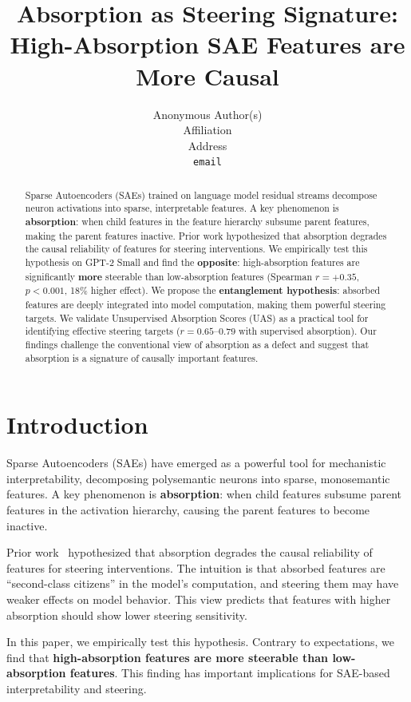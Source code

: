 \documentclass{article}
\title{Absorption as Steering Signature: High-Absorption SAE Features are More Causal}
\author{%
  Anonymous Author(s) \\
  Affiliation \\
  Address \\
  \texttt{email}
}
\begin{document}
\maketitle


\begin{abstract}
Sparse Autoencoders (SAEs) trained on language model residual streams decompose neuron activations into sparse, interpretable features. A key phenomenon is \textbf{absorption}: when child features in the feature hierarchy subsume parent features, making the parent features inactive. Prior work hypothesized that absorption degrades the causal reliability of features for steering interventions. We empirically test this hypothesis on GPT-2 Small and find the \textbf{opposite}: high-absorption features are significantly \textbf{more} steerable than low-absorption features (Spearman $r=+0.35$, $p<0.001$, 18\% higher effect). We propose the \textbf{entanglement hypothesis}: absorbed features are deeply integrated into model computation, making them powerful steering targets. We validate Unsupervised Absorption Scores (UAS) as a practical tool for identifying effective steering targets ($r=0.65\text{--}0.79$ with supervised absorption). Our findings challenge the conventional view of absorption as a defect and suggest that absorption is a signature of causally important features.
\end{abstract}


\section{Introduction}

Sparse Autoencoders (SAEs) have emerged as a powerful tool for mechanistic interpretability, decomposing polysemantic neurons into sparse, monosemantic features. A key phenomenon is \textbf{absorption}: when child features subsume parent features in the activation hierarchy, causing the parent features to become inactive.

Prior work~\citep{anthropic2023towards} hypothesized that absorption degrades the causal reliability of features for steering interventions. The intuition is that absorbed features are ``second-class citizens'' in the model's computation, and steering them may have weaker effects on model behavior. This view predicts that features with higher absorption should show lower steering sensitivity.

In this paper, we empirically test this hypothesis. Contrary to expectations, we find that \textbf{high-absorption features are more steerable than low-absorption features}. This finding has important implications for SAE-based interpretability and steering.
\end{document}
